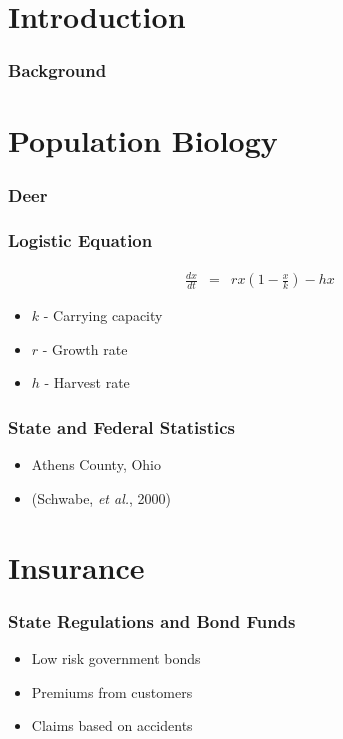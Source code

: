 


\section{Introduction}

\begin{frame}
    \frametitle{Background}
\end{frame}




\section{Population Biology}

\begin{frame}
    \frametitle{Deer}
\end{frame}

\begin{frame}
    \frametitle{Logistic Equation}
	\vspace{-1cm}
	\begin{eqnarray*}
		\frac{dx}{dt} &=& rx \left( 1-\frac{x}{k} \right) -hx
	\end{eqnarray*}
	\begin{itemize}
		\item $k$ - Carrying capacity
		\item $r$ - Growth rate
		\item $h$ - Harvest rate
	\end{itemize}
\end{frame}


\begin{frame}
    \frametitle{State and Federal Statistics}
	\begin{itemize}
		\item Athens County, Ohio
		\item (Schwabe, \emph{et al.}, 2000)
	\end{itemize}
\end{frame}






\section{Insurance}

\begin{frame}
    \frametitle{State Regulations and Bond Funds}
	\begin{itemize}
		\item Low risk government bonds
		\item Premiums from customers
		\item Claims based on accidents
	\end{itemize}
\end{frame}